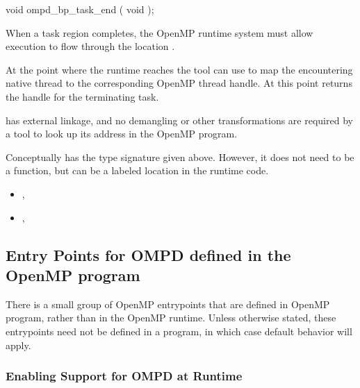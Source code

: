 \begin{cspecific}
\begin{ompSyntax}
void ompd_bp_task_end ( void );
\end{ompSyntax}
\end{cspecific}


\descr

When a task region completes, the OpenMP runtime system
must allow execution to flow through the location .

At the point where the runtime reaches 
the tool can use
to map the encountering native thread to the corresponding
OpenMP thread handle.
At this point 
returns the handle for the terminating task.

\restrictions

 has external  linkage, and no
demangling or other transformations are required by a tool
to look up its address in the OpenMP program.

Conceptually  has the type signature
given above.
However, it does not need to be a function, but can be a labeled location
in the runtime code.

\crossreferences
\begin{itemize}
\item
  , 
\item
  , 
\end{itemize}


\subsection{Entry Points for OMPD defined in the OpenMP program}

There is a small group of OpenMP entrypoints that are defined in
OpenMP program, rather than in the OpenMP runtime.
Unless otherwise stated, these entrypoints need not be defined
in a program, in which case default behavior will apply.

\subsubsection{Enabling Support for OMPD at Runtime}
\label{ompd:ompd_enable}

